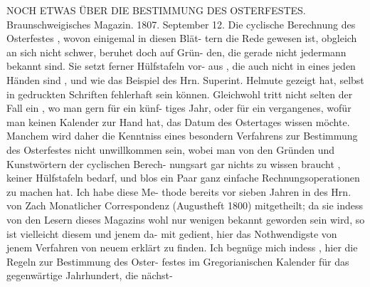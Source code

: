 \documentclass[12pt,a4paper]{article}
\begin{document}
\newpage

NOCH  ETWAS  ÜBER  DIE  BESTIMMUNG  DES  OSTERFESTES.
Braunschweigisches  Magazin.     1807.  September  12.
Die  cyclische  Berechnung  des  Osterfestes ,  wovon  einigemal  in  diesen  Blät-
tern die  Rede  gewesen  ist,  obgleich  an  sich  nicht  schwer,  beruhet  doch  auf  Grün-
den, die  gerade  nicht  jedermann  bekannt  sind.  Sie  setzt  ferner  Hülfstafeln  vor-
aus ,  die  auch  nicht  in  eines  jeden  Händen  sind ,  und  wie  das  Beispiel  des  Hrn.
Superint.  Helmute  gezeigt  hat,  selbst  in  gedruckten  Schriften  fehlerhaft  sein
können.  Gleichwohl  tritt  nicht  selten  der  Fall  ein ,  wo  man  gern  für  ein  künf-
tiges Jahr,  oder  für  ein  vergangenes,  wofür  man  keinen  Kalender  zur  Hand  hat,
das  Datum  des  Ostertages  wissen  möchte.  Manchem  wird  daher  die  Kenntniss
eines  besondern  Verfahrens  zur  Bestimmung  des  Osterfestes  nicht  unwillkommen
sein,  wobei  man  von  den  Gründen  und  Kunstwörtern  der  cyclischen  Berech-
nungsart  gar  nichts  zu  wissen  braucht ,  keiner  Hülfstafeln  bedarf,  und  blos  ein
Paar  ganz  einfache  Rechnungsoperationen  zu  machen  hat.  Ich  habe  diese  Me-
thode bereits  vor  sieben  Jahren  in  des  Hrn.  von  Zach  Monatlicher  Correspondenz
(Augustheft  1800)  mitgetheilt;  da  sie  indess  von  den  Lesern  dieses  Magazins  wohl
nur  wenigen  bekannt  geworden  sein  wird,  so  ist  vielleicht  diesem  und  jenem  da-
mit gedient,  hier  das  Nothwendigste  von  jenem  Verfahren  von  neuem  erklärt  zu
finden.  Ich  begnüge  mich  indess ,  hier  die  Regeln  zur  Bestimmung  des  Oster-
festes im  Gregorianischen  Kalender  für  das  gegenwärtige  Jahrhundert,  die  nächst-

\newpage
\end{document}
